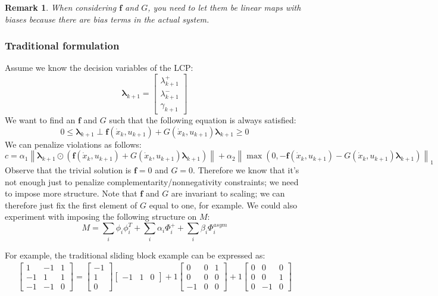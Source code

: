 \documentclass{article}
\newtheorem{remark}{Remark}
\renewcommand{\vec}[1]{\boldsymbol{#1}}
\newcommand{\norm}[1]{\left\lVert#1\right\rVert}
\begin{document}
\begin{remark}
    When considering $\vec{f}$ and $G$, you need to let them be linear maps with biases because there are bias terms in the actual system. 
\end{remark}

\subsubsection{Traditional formulation}
Assume we know the decision variables of the LCP:
\[
    \vec{\lambda}_{k+1} =
    \begin{bmatrix}
        \lambda^+_{k+1} \\
        \lambda^-_{k+1} \\
        \gamma_{k+1}
    \end{bmatrix}
\]
We want to find an $\vec{f}$ and $G$ such that the following equation is always satisfied:
\[
    0 \leq \vec{\lambda}_{k+1} \perp \vec{f}(\dot x_k, u_{k+1}) + G(\dot x_k, u_{k+1}) \vec{\lambda}_{k+1} \geq 0
\]
We can penalize violations as follows:
\[
    c = \alpha_1 \norm{\vec{\lambda}_{k+1} \odot (\vec{f}(\dot x_k, u_{k+1}) + G(\dot x_k, u_{k+1}) \vec{\lambda}_{k+1})} + \alpha_2 \norm{\max \left(0, -\vec{f}(\dot x_k, u_{k+1}) - G(\dot x_k, u_{k+1}) \vec{\lambda}_{k+1}\right)}_1
\] 
Observe that the trivial solution is $\vec{f} = 0$ and $G = 0$. Therefore we know that it's not enough just to penalize complementarity/nonnegativity constraints; we need to impose more structure. Note that $\vec{f}$ and $G$ are invariant to scaling; we can therefore just fix the first element of $G$ equal to one, for example. We could also experiment with imposing the following structure on $M$:
\[
    M = \sum_i \phi_i \phi_i^T + \sum_i \alpha_i \Phi_i^+ + \sum_i \beta_i \Phi_i^{asym}
\]

For example, the traditional sliding block example can be expressed as:
\begin{align*}
    \begin{bmatrix}
        1 & -1 & 1 \\
        -1 & 1 & 1 \\
        -1 & -1 & 0
    \end{bmatrix}
    = 
    \begin{bmatrix}
        -1 \\
        1 \\
        0
    \end{bmatrix}
    \begin{bmatrix}
        -1 & 1 & 0
    \end{bmatrix}
    +
    1
    \begin{bmatrix}
        0 & 0 & 1 \\
        0 & 0 & 0 \\
        -1 & 0 & 0
    \end{bmatrix}
    +
    1
    \begin{bmatrix}
        0 & 0 & 0 \\
        0 & 0 & 1 \\
        0 & -1 & 0
    \end{bmatrix}
\end{align*}
\end{document}
